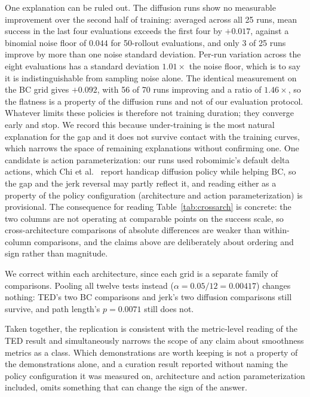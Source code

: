 \documentclass[10pt]{article}
\begin{document}
One explanation can be ruled out. The diffusion runs show no measurable
improvement over the second half of training: averaged across all 25 runs,
mean success in the last four evaluations exceeds the first four by
$+0.017$, against a binomial noise floor of $0.044$ for 50-rollout
evaluations, and only 3 of 25 runs improve by more than one noise standard
deviation. Per-run variation across the eight evaluations has a standard
deviation $1.01\times$ the noise floor, which is to say it is
indistinguishable from sampling noise alone. The identical measurement on
the BC grid gives $+0.092$, with 56 of 70 runs improving and a ratio of
$1.46\times$, so the flatness is a property of the diffusion runs and not
of our evaluation protocol. Whatever limits these policies is therefore not
training duration; they converge early and stop. We record this because
under-training is the most natural explanation for the gap and it does not
survive contact with the training curves, which narrows the space of
remaining explanations without confirming one. One candidate is action
parameterization: our runs used robomimic's default delta actions, which
Chi et al.~\citep{chi-dp} report handicap diffusion policy while helping BC,
so the gap and the jerk reversal may partly reflect it, and reading either
as a property of the policy configuration (architecture and action
parameterization) is provisional. The consequence for reading
Table~\ref{tab:crossarch} is concrete: the two
columns are not operating at comparable points on the success scale, so
cross-architecture comparisons of absolute differences are weaker than
within-column comparisons, and the claims above are deliberately about
ordering and sign rather than magnitude.

We correct within each architecture, since each grid is a separate family of
comparisons. Pooling all twelve tests instead ($\alpha = 0.05/12 = 0.00417$)
changes nothing: TED's two BC comparisons and jerk's two diffusion
comparisons still survive, and path length's $p = 0.0071$ still does not.

Taken together, the replication is consistent with the metric-level reading of the TED
result and simultaneously narrows the scope of any claim about smoothness
metrics as a class. Which demonstrations are worth keeping is not a property
of the demonstrations alone, and a curation result reported without naming
the policy configuration it was measured on, architecture and action
parameterization included, omits something that can change the sign of the
answer.
\end{document}
